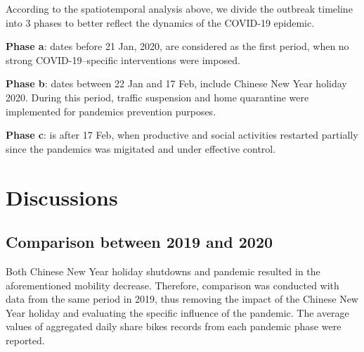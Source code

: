 \documentclass[ijgi,submit,moreauthors,pdftex]{Definitions/mdpi}
\begin{document}
According to the spatiotemporal analysis above, we divide the outbreak timeline into 3 phases to better reflect the dynamics of the COVID-19 epidemic.

\textbf{Phase a}: dates before 21 Jan, 2020, are considered as the first period, when no strong COVID-19–specific interventions were imposed.

\textbf{Phase b}: dates between 22 Jan and 17 Feb, include Chinese New Year holiday 2020. During this period, traffic suspension and home quarantine were implemented for pandemics prevention purposes.

\textbf{Phase c}: is after 17 Feb, when productive and social activities restarted partially since the pandemics was migitated and under effective control.


\section{Discussions}
\subsection{Comparison between 2019 and 2020}%

Both Chinese New Year holiday shutdowns and pandemic resulted in the aforementioned mobility decrease.
Therefore, comparison was conducted with data from the same period in 2019, thus removing the impact of the Chinese New Year holiday and evaluating the specific influence of the pandemic.  
The average values of aggregated daily share bikes records from each pandemic phase were reported.
\end{document}
